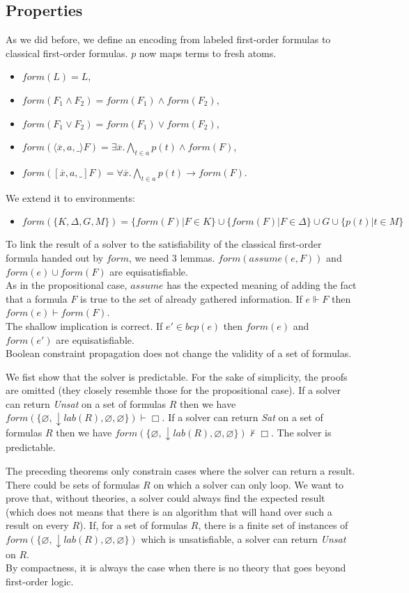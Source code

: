 \documentclass[a4paper,11pt]{article}
\newcommand{\F}{\mathit{form}}
\newcommand{\T}{\mathit{lab}}
\newcommand{\A}{\mathit{assume}}
\newcommand{\B}{\mathit{bcp}}
\begin{document}
\subsection{Properties}
As we did before, we define an encoding from labeled first-order formulas to classical
first-order formulas. $p$ now maps terms to fresh atoms.
\begin{itemize}
 \item $\F(L)=L$,
 \item $\F(F_1\wedge F_2)=\F(F_1)\wedge\F(F_2)$,
 \item $\F(F_1\vee F_2)=\F(F_1)\vee\F(F_2)$,
 \item $\F(\langle\overline x,a,\_\rangle F)=\exists\overline x.\bigwedge_{t\in a} p(t)\wedge\F(F)$,
 \item $\F([\overline x,a,\_]F)=\forall \overline x.\bigwedge_{t\in a} p(t)\rightarrow\F(F)$.
\end{itemize}
We extend it to environments:
\begin{itemize}
 \item $\F(\{K,\Delta,G,M\})=\{\F(F)|F\in K\}\cup\{\F(F)|F\in\Delta\}\cup G\cup\{p(t)|t\in M\}$
\end{itemize}
To link the result of a solver to the satisfiability of the classical first-order formula handed out
by $\F$, we need 3 lemmas.
{\lemma $\F(\A(e,F))$ and $\F(e)\cup\F(F)$ are equisatisfiable.}\\
As in the propositional case, $\A$ has the expected meaning of adding the fact that a formula $F$
is true to the set of already gathered information.
{\lemma If $e\Vdash F$ then $\F(e)\vdash\F(F)$.}\\
The shallow implication is correct.
{\lemma If $e'\in\B(e)$ then $\F(e)$ and $\F(e')$ are equisatisfiable.}\\
Boolean constraint propagation does not change the validity of a set of formulas.

We fist show that the solver is predictable. For the sake of simplicity,
the proofs are omitted (they closely resemble those for the propositional case).
{\theorem If a solver can return \emph{Unsat} on a set of formulas $R$ then we have
$\F(\{\varnothing,\downarrow\T(R),\varnothing,\varnothing\})\vdash\Box$.}
{\theorem If a solver can return \emph{Sat} on a set of formulas $R$ then we have
$\F(\{\varnothing,\downarrow\T(R),\varnothing,\varnothing\})\nvdash\Box$.}
{\corollary The solver is predictable.}

The preceding theorems only constrain cases where the solver can return a result.
There could be sets of formulas $R$ on which a solver can only loop. We want to prove that, without
theories, a solver could always find the expected result (which does not means that there is an algorithm
that will hand over such a result on every $R$).
{\theorem If, for a set of formulas $R$, there is a finite set of instances of
$\F(\{\varnothing,\downarrow\T(R),\varnothing,\varnothing\})$ which is unsatisfiable,
a solver can return \emph{Unsat} on $R$.}\\
By compactness, it is always the case when there is no theory that goes
beyond first-order logic.
\end{document}

